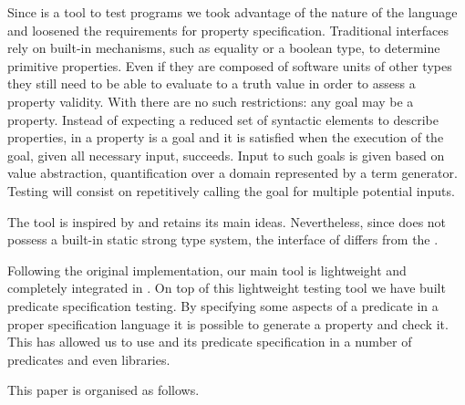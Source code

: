 Since \plqc{} is a tool to test \Prolog{} programs we took advantage of
the nature of the language and loosened the requirements for property
specification.
%
Traditional interfaces rely on built-in mechanisms, such as equality or
a boolean type, to determine primitive properties.
%
Even if they are composed of software units of other types they still
need to be able to evaluate to a truth value in order to assess a
property validity.
%
With \Prolog{} there are no such restrictions: any goal may be a property.
%
Instead of expecting a reduced set of syntactic elements to describe
properties, in \plqc{} a property is a goal and it is satisfied when
the execution of the goal, given all necessary input, succeeds.
%
Input to such goals is given based on \plqc{} value abstraction,
quantification over a domain represented by a term generator.
%
Testing will consist on repetitively calling the goal for multiple
potential inputs.


The \plqc{} tool is inspired by \QuickCheck{} and retains its main
ideas.
%
%
Nevertheless, since \Prolog{} does not possess a built-in static strong
type system, the interface of \plqc{} differs from the \Haskell{}
\QuickCheck{}.

Following the original \QuickCheck{} implementation, our main tool is
lightweight and completely integrated in \Prolog{}.
%
On top of this lightweight testing tool we have built predicate
specification testing.
%
By specifying some aspects of a predicate in a proper specification
language it is possible to generate a \plqc{} property and check it.
%
This has allowed us to  use \plqc{} and its predicate specification in a number of
predicates and even libraries.




This paper is organised as follows.
%


